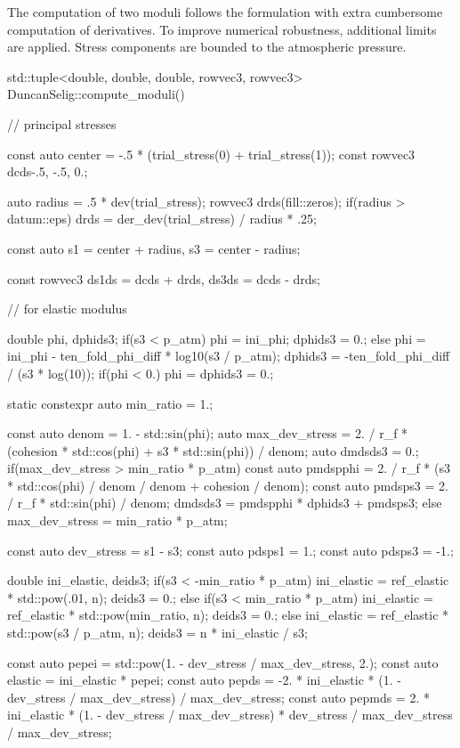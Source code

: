 The computation of two moduli follows the formulation with extra cumbersome computation of derivatives.
To improve numerical robustness, additional limits are applied. Stress components are bounded to the atmospheric pressure.
\begin{cppcode}
std::tuple<double, double, double, rowvec3, rowvec3> DuncanSelig::compute_moduli() {
    // principal stresses

    const auto center = -.5 * (trial_stress(0) + trial_stress(1));
    const rowvec3 dcds{-.5, -.5, 0.};

    auto radius = .5 * dev(trial_stress);
    rowvec3 drds(fill::zeros);
    if(radius > datum::eps) drds = der_dev(trial_stress) / radius * .25;

    const auto s1 = center + radius, s3 = center - radius;

    const rowvec3 ds1ds = dcds + drds, ds3ds = dcds - drds;

    // for elastic modulus

    double phi, dphids3;
    if(s3 < p_atm) {
        phi = ini_phi;
        dphids3 = 0.;
    }
    else {
        phi = ini_phi - ten_fold_phi_diff * log10(s3 / p_atm);
        dphids3 = -ten_fold_phi_diff / (s3 * log(10));
        if(phi < 0.) phi = dphids3 = 0.;
    }

    static constexpr auto min_ratio = 1.;

    const auto denom = 1. - std::sin(phi);
    auto max_dev_stress = 2. / r_f * (cohesion * std::cos(phi) + s3 * std::sin(phi)) / denom;
    auto dmdsds3 = 0.;
    if(max_dev_stress > min_ratio * p_atm) {
        const auto pmdspphi = 2. / r_f * (s3 * std::cos(phi) / denom / denom + cohesion / denom);
        const auto pmdsps3 = 2. / r_f * std::sin(phi) / denom;
        dmdsds3 = pmdspphi * dphids3 + pmdsps3;
    }
    else max_dev_stress = min_ratio * p_atm;

    const auto dev_stress = s1 - s3;
    const auto pdsps1 = 1.;
    const auto pdsps3 = -1.;

    double ini_elastic, deids3;
    if(s3 < -min_ratio * p_atm) {
        ini_elastic = ref_elastic * std::pow(.01, n);
        deids3 = 0.;
    }
    else if(s3 < min_ratio * p_atm) {
        ini_elastic = ref_elastic * std::pow(min_ratio, n);
        deids3 = 0.;
    }
    else {
        ini_elastic = ref_elastic * std::pow(s3 / p_atm, n);
        deids3 = n * ini_elastic / s3;
    }

    const auto pepei = std::pow(1. - dev_stress / max_dev_stress, 2.);
    const auto elastic = ini_elastic * pepei;
    const auto pepds = -2. * ini_elastic * (1. - dev_stress / max_dev_stress) / max_dev_stress;
    const auto pepmds = 2. * ini_elastic * (1. - dev_stress / max_dev_stress) * dev_stress / max_dev_stress / max_dev_stress;

}
\end{cppcode}
